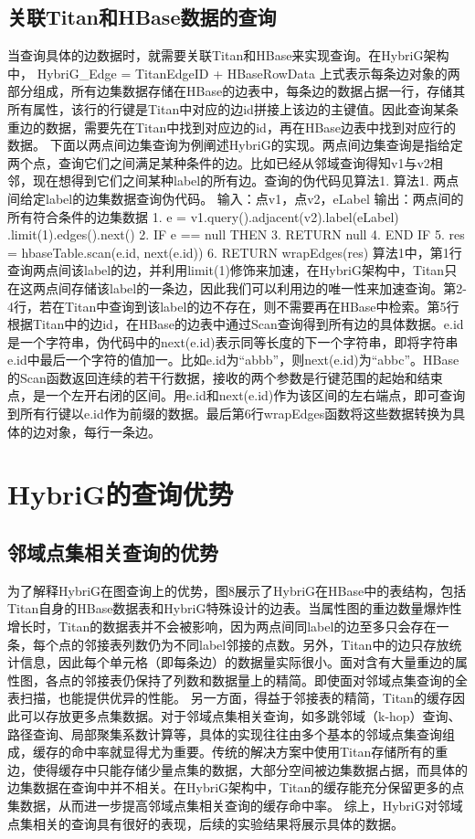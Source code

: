 \subsection{关联Titan和HBase数据的查询}
当查询具体的边数据时，就需要关联Titan和HBase来实现查询。在HybriG架构中，
HybriG\_Edge = TitanEdgeID + HBaseRowData
上式表示每条边对象的两部分组成，所有边集数据存储在HBase的边表中，每条边的数据占据一行，存储其所有属性，该行的行键是Titan中对应的边id拼接上该边的主键值。因此查询某条重边的数据，需要先在Titan中找到对应边的id，再在HBase边表中找到对应行的数据。
下面以两点间边集查询为例阐述HybriG的实现。两点间边集查询是指给定两个点，查询它们之间满足某种条件的边。比如已经从邻域查询得知v1与v2相邻，现在想得到它们之间某种label的所有边。查询的伪代码见算法1.
算法1.	两点间给定label的边集数据查询伪代码。
输入：点v1，点v2，eLabel
输出：两点间的所有符合条件的边集数据
1.	e = v1.query().adjacent(v2).label(eLabel)
.limit(1).edges().next()
2.	IF e == null THEN
3.	    RETURN null
4.	END IF
5.	res = hbaseTable.scan(e.id, next(e.id))
6.	RETURN wrapEdges(res)
算法1中，第1行查询两点间该label的边，并利用limit(1)修饰来加速，在HybriG架构中，Titan只在这两点间存储该label的一条边，因此我们可以利用边的唯一性来加速查询。第2-4行，若在Titan中查询到该label的边不存在，则不需要再在HBase中检索。第5行根据Titan中的边id，在HBase的边表中通过Scan查询得到所有边的具体数据。e.id是一个字符串，伪代码中的next(e.id)表示同等长度的下一个字符串，即将字符串e.id中最后一个字符的值加一。比如e.id为“abbb”，则next(e.id)为“abbc”。HBase的Scan函数返回连续的若干行数据，接收的两个参数是行键范围的起始和结束点，是一个左开右闭的区间。用e.id和next(e.id)作为该区间的左右端点，即可查询到所有行键以e.id作为前缀的数据。最后第6行wrapEdges函数将这些数据转换为具体的边对象，每行一条边。

\section{HybriG的查询优势}
\subsection{邻域点集相关查询的优势}
为了解释HybriG在图查询上的优势，图8展示了HybriG在HBase中的表结构，包括Titan自身的HBase数据表和HybriG特殊设计的边表。当属性图的重边数量爆炸性增长时，Titan的数据表并不会被影响，因为两点间同label的边至多只会存在一条，每个点的邻接表列数仍为不同label邻接的点数。另外，Titan中的边只存放统计信息，因此每个单元格（即每条边）的数据量实际很小。面对含有大量重边的属性图，各点的邻接表仍保持了列数和数据量上的精简。即使面对邻域点集查询的全表扫描，也能提供优异的性能。
另一方面，得益于邻接表的精简，Titan的缓存因此可以存放更多点集数据。对于邻域点集相关查询，如多跳邻域（k-hop）查询、路径查询、局部聚集系数计算等，具体的实现往往由多个基本的邻域点集查询组成，缓存的命中率就显得尤为重要。传统的解决方案中使用Titan存储所有的重边，使得缓存中只能存储少量点集的数据，大部分空间被边集数据占据，而具体的边集数据在查询中并不相关。在HybriG架构中，Titan的缓存能充分保留更多的点集数据，从而进一步提高邻域点集相关查询的缓存命中率。
综上，HybriG对邻域点集相关的查询具有很好的表现，后续的实验结果将展示具体的数据。

